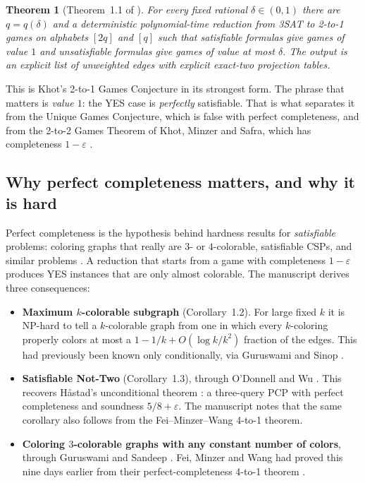 \documentclass[11pt]{article}
\newtheorem{theorem}{Theorem}[section]
\theoremstyle{definition}
\theoremstyle{remark}
\newcommand{\eps}{\varepsilon}
\begin{document}
\begin{theorem}[Theorem~1.1 of \cite{OAI}]\label{thm:main}
For every fixed rational $\delta\in(0,1)$ there are $q=q(\delta)$ and a
deterministic polynomial-time reduction from 3SAT to 2-to-1 games on alphabets
$[2q]$ and $[q]$ such that satisfiable formulas give games of value $1$ and
unsatisfiable formulas give games of value at most $\delta$. The output is an
explicit list of unweighted edges with explicit exact-two projection tables.
\end{theorem}

This is Khot's 2-to-1 Games Conjecture \cite{Khot} in its strongest form. The
phrase that matters is \emph{value $1$}: the YES case is \emph{perfectly}
satisfiable. That is what separates it from the Unique Games Conjecture, which
is false with perfect completeness, and from the 2-to-2 Games Theorem of Khot,
Minzer and Safra, which has completeness $1-\eps$ \cite{KMS17,DKKMS,BKS,KMS18}.

\subsection{Why perfect completeness matters, and why it is hard}

Perfect completeness is the hypothesis behind hardness results for
\emph{satisfiable} problems: coloring graphs that really are $3$- or
$4$-colorable, satisfiable CSPs, and similar problems
\cite{DMR,GS,GSan,OW}. A reduction that starts from a game with completeness
$1-\eps$ produces YES instances that are only almost colorable. The manuscript
derives three consequences:
\begin{itemize}
\item \textbf{Maximum $k$-colorable subgraph} (Corollary~1.2). For large fixed
$k$ it is NP-hard to tell a $k$-colorable graph from one in which every
$k$-coloring properly colors at most a $1-1/k+O(\log k/k^2)$ fraction of the
edges. This had previously been known only conditionally, via Guruswami and
Sinop \cite{GS}.
\item \textbf{Satisfiable Not-Two} (Corollary~1.3), through O'Donnell and Wu
\cite{OW}. This recovers H{\aa}stad's unconditional theorem \cite{Hastad}: a
three-query PCP with perfect completeness and soundness $5/8+\eps$. The
manuscript notes that the same corollary also follows from the
Fei--Minzer--Wang 4-to-1 theorem.
\item \textbf{Coloring $3$-colorable graphs with any constant number of
colors}, through Guruswami and Sandeep \cite{GSan}. Fei, Minzer and Wang had
proved this nine days earlier from their perfect-completeness 4-to-1 theorem
\cite{FMW}.
\end{itemize}
\end{document}

